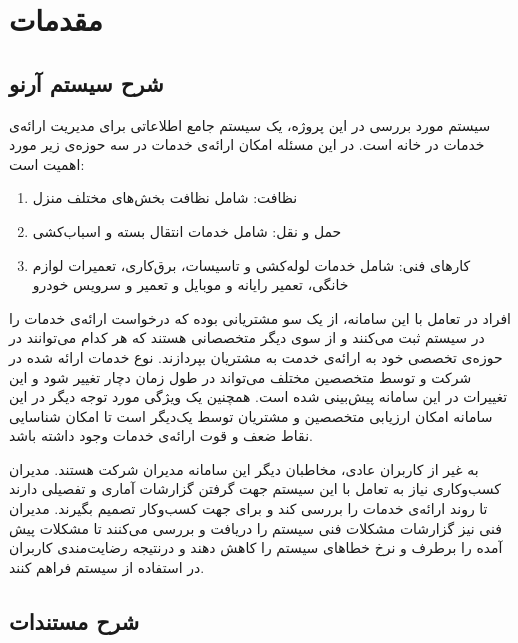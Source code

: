 
\chapter{مقدمات}

\section{شرح سیستم آرنو}

سیستم مورد بررسی در این پروژه، ‌یک سیستم جامع اطلاعاتی برای مدیریت ارائه‌ی خدمات در خانه است. 
در این مسئله امکان ارائه‌ی خدمات در سه حوزه‌ی زیر مورد اهمیت است:

\begin{enumerate}
\item
نظافت: شامل نظافت بخش‌های مختلف منزل 
\item
حمل و نقل: شامل خدمات انتقال بسته و اسباب‌کشی
\item 
کارهای فنی: شامل خدمات لوله‌کشی و تاسیسات، برق‌کاری، تعمیرات لوازم خانگی، تعمیر رایانه و موبایل و تعمیر و سرویس خودرو

\end{enumerate}

افراد در تعامل با این سامانه، از یک سو مشتریانی بوده که درخواست ارائه‌ی خدمات را در سیستم ثبت می‌کنند و از سوی دیگر متخصصانی هستند که هر کدام می‌توانند در حوزه‌ی تخصصی خود به ارائه‌ی خدمت به مشتریان بپردازند. نوع خدمات ارائه شده در شرکت و توسط متخصصین مختلف می‌تواند در طول زمان دچار تغییر شود و این تغییرات در این سامانه پیش‌بینی شده است. همچنین یک ویژگی مورد توجه دیگر در این سامانه امکان ارزیابی متخصصین و مشتریان توسط یک‌دیگر است تا امکان شناسایی نقاط ضعف و قوت ارائه‌ی خدمات وجود داشته باشد.

به غیر از کاربران عادی، مخاطبان دیگر این سامانه مدیران شرکت هستند. مدیران کسب‌وکاری نیاز به تعامل با این سیستم جهت گرفتن گزارشات آماری و تفصیلی دارند تا روند ارائه‌ی خدمات را بررسی کند و برای جهت کسب‌و‌کار تصمیم بگیرند. مدیران فنی نیز گزارشات مشکلات فنی سیستم را دریافت و بررسی می‌کنند تا مشکلات پیش آمده را برطرف و نرخ خطاهای سیستم را کاهش دهند و درنتیجه رضایت‌مندی کاربران در استفاده از سیستم فراهم کنند.


\section{شرح مستندات}


